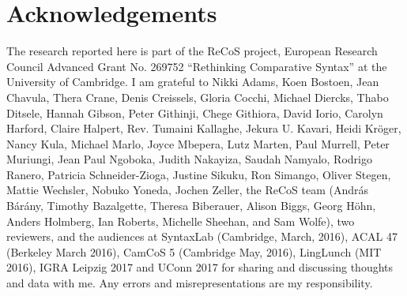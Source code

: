 \documentclass[output=paper
,modfonts
,nonflat]{langsci/langscibook}
\begin{document}
\section*{Acknowledgements}
The research reported here is part of the ReCoS project, European Research Council Advanced Grant No. 269752 ``Rethinking Comparative Syntax'' at the University of Cambridge. I am grateful to Nikki Adams, Koen Bostoen, Jean Chavula, Thera Crane, Denis Creissels, Gloria Cocchi, Michael Diercks, Thabo Ditsele, Hannah Gibson, Peter Githinji, Chege Githiora, David Iorio, Carolyn Harford, Claire Halpert, Rev. Tumaini Kallaghe, Jekura U. Kavari, Heidi Kröger, Nancy Kula, Michael Marlo, Joyce Mbepera, Lutz Marten, Paul Murrell, Peter Muriungi, Jean Paul Ngoboka, Judith Nakayiza, Saudah Namyalo, Rodrigo Ranero, Patricia Schneider-Zioga, Justine Sikuku, Ron Simango, Oliver Stegen, Mattie Wechsler, Nobuko Yoneda, Jochen Zeller, the ReCoS team (András Bárány, Timothy Bazalgette, Theresa Biberauer, Alison Biggs, Georg Höhn, Anders Holmberg, Ian Roberts, Michelle Sheehan, and Sam Wolfe), two reviewers, and the audiences at SyntaxLab (Cambridge, March, 2016), ACAL 47 (Berkeley March 2016), CamCoS 5 (Cambridge May, 2016), LingLunch (MIT 2016), IGRA Leipzig 2017 and UConn 2017 for sharing and discussing thoughts and data with me. Any errors and misrepresentations are my responsibility.



\sloppy
\printbibliography[heading=subbibliography,notkeyword=this]
\end{document}
